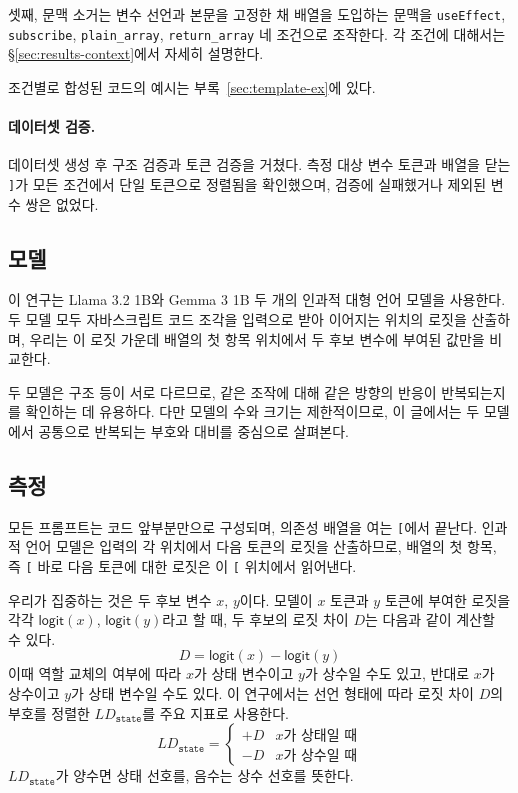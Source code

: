 \documentclass[11pt]{article}
\begin{document}
셋째, 문맥 소거는 변수 선언과 본문을 고정한 채 배열을 도입하는 문맥을 \texttt{useEffect}, \texttt{subscribe}, \texttt{plain\_array}, \texttt{return\_array} 네 조건으로 조작한다. 각 조건에 대해서는 \S\ref{sec:results-context}에서 자세히 설명한다.

조건별로 합성된 코드의 예시는 부록~\ref{sec:template-ex}에 있다.

\paragraph{데이터셋 검증.}
데이터셋 생성 후 구조 검증과 토큰 검증을 거쳤다.
측정 대상 변수 토큰과 배열을 닫는 \texttt{]}가 모든 조건에서 단일 토큰으로 정렬됨을 확인했으며, 검증에 실패했거나 제외된 변수 쌍은 없었다.

\subsection{모델}
\label{sec:method-models}

이 연구는 Llama 3.2 1B\citep{llama}와 Gemma 3 1B\citep{gemma} 두 개의 인과적 대형 언어 모델을 사용한다.
두 모델 모두 자바스크립트 코드 조각을 입력으로 받아 이어지는 위치의 로짓을 산출하며, 우리는 이 로짓 가운데 배열의 첫 항목 위치에서 두 후보 변수에 부여된 값만을 비교한다.

두 모델은 구조 등이 서로 다르므로, 같은 조작에 대해 같은 방향의 반응이 반복되는지를 확인하는 데 유용하다.
다만 모델의 수와 크기는 제한적이므로, 이 글에서는 두 모델에서 공통으로 반복되는 부호와 대비를 중심으로 살펴본다.

\subsection{측정}
\label{sec:method-measurement}

모든 프롬프트는 코드 앞부분만으로 구성되며, 의존성 배열을 여는 \texttt{[}에서 끝난다.
인과적 언어 모델은 입력의 각 위치에서 다음 토큰의 로짓을 산출하므로, 배열의 첫 항목, 즉 \texttt{[} 바로 다음 토큰에 대한 로짓은 이 \texttt{[} 위치에서 읽어낸다.

우리가 집중하는 것은 두 후보 변수 $x$, $y$이다.
모델이 $x$ 토큰과 $y$ 토큰에 부여한 로짓을 각각 $\textsf{logit}(x)$, $\textsf{logit}(y)$라고 할 때, 두 후보의 로짓 차이 $D$는 다음과 같이 계산할 수 있다.
\[
D = \textsf{logit}(x) - \textsf{logit}(y)
\]
이때 역할 교체의 여부에 따라 $x$가 상태 변수이고 $y$가 상수일 수도 있고, 반대로 $x$가 상수이고 $y$가 상태 변수일 수도 있다.
이 연구에서는 선언 형태에 따라 로짓 차이 $D$의 부호를 정렬한 $LD_\texttt{state}$를 주요 지표로 사용한다.
\[
LD_{\texttt{state}} =
\begin{cases}
  +D & x\text{가 상태일 때} \\
  -D & x\text{가 상수일 때}
\end{cases}
\]
$LD_{\texttt{state}}$가 양수면 상태 선호를, 음수는 상수 선호를 뜻한다.
\end{document}
